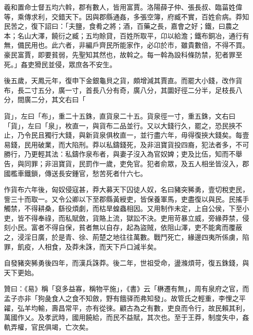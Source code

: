 \begin{pinyinscope}
羲和置命士督五均六斡，郡有數人，皆用富賈。洛陽薛子仲、張長叔、臨菑姓偉等，乘傳求利，交錯天下。因與郡縣通姦，多張空簿，府臧不實，百姓俞病。莽知民苦之，復下詔曰：「夫鹽，食肴之將；酒，百藥之長，嘉會之好；鐵，曰農之本；名山大澤，饒衍之臧；五均賒貸，百姓所取平，卬以給澹；鐵布銅冶，通行有無，備民用也。此六者，非編戶齊民所能家作，必卬於市，雖貴數倍，不得不買。豪民富賈，即要貧弱，先聖知其然也，故斡之。每一斡為設科條防禁，犯者罪至死。」姦吏猾民並侵，眾庶各不安生。

後五歲，天鳳元年，復申下金銀龜貝之貨，頗增減其賈直。而罷大小錢，改作貨布，長二寸五分，廣一寸，首長八分有奇，廣八分，其圜好徑二分半，足枝長八分，間廣二分，其文右曰「

貨」，左曰「布」，重二十五銖，直貨泉二十五。貨泉徑一寸，重五銖，文右曰「貨」，左曰「泉」，枚直一，與貨布二品並行。又以大錢行久，罷之，恐民挾不止，乃令民且獨行大錢，與新貨泉俱枚直一，並行盡六年，毋得復挾大錢矣。每壹易錢，民用破業，而大陷刑。莽以私鑄錢死，及非沮寶貨投四裔，犯法者多，不可勝行，乃更輕其法：私鑄作泉布者，與妻子沒入為官奴婢；吏及比伍，知而不舉告，與同罪；非沮寶貨，民罰作一歲，吏免官。犯者俞眾，及五人相坐皆沒入，郡國檻車鐵鎖，傳送長安鍾官，愁苦死者什六七。

作貨布六年後，匈奴侵寇甚，莽大募天下囚徒人奴，名曰豬突豨勇，壹切稅吏民，訾三十而取一。又令公卿以下至郡縣黃綬吏，皆保養軍馬，吏盡復以與民。民搖手觸禁，不得耕桑，繇役煩劇，而枯旱蝗蟲相因。又用制作未定，上自公侯，下至小吏，皆不得奉祿，而私賦斂，貨賂上流，獄訟不決。吏用苛暴立威，旁緣莽禁，侵刻小民。富者不得自保，貧者無以自存，起為盜賊，依阻山澤，吏不能禽而覆蔽之，浸淫日廣，於是青、徐、荊楚之地往往萬數。戰鬥死亡，緣邊四夷所係虜，陷罪，飢疫，人相食，及莽未誅，而天下戶口減半矣。

自發豬突豨勇後四年，而漢兵誅莽。後二年，世祖受命，盪滌煩苛，復五銖錢，與天下更始。

贊曰：《易》稱「裒多益寡，稱物平施」，《書》云「楙遷有無」，周有泉府之官，而孟子亦非「狗彘食人之食不知斂，野有餓驿而弗知發」。故管氏之輕重，李悝之平糴，弘羊均輸，壽昌常平，亦有從徠。顧古為之有數，吏良而令行，故民賴其利，萬國作乂。及孝武時，國用饒給，而民不益賦，其次也。至于王莽，制度失中，姦軌弄權，官民俱竭，亡次矣。


\end{pinyinscope}